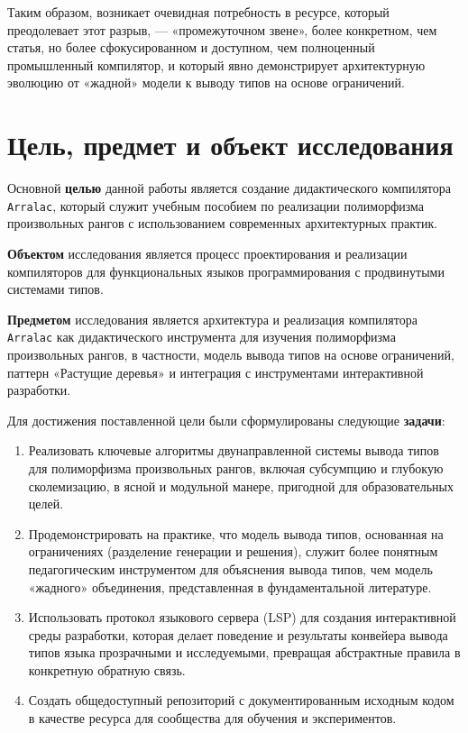 Таким образом, возникает очевидная потребность в ресурсе, который преодолевает этот разрыв, — «промежуточном звене», более конкретном, чем статья, но более сфокусированном и доступном, чем полноценный промышленный компилятор, и который явно демонстрирует архитектурную эволюцию от «жадной» модели к выводу типов на основе ограничений.

\section*{Цель, предмет и объект исследования}
Основной \textbf{целью} данной работы является создание дидактического компилятора \texttt{Arralac}, который служит учебным пособием по реализации полиморфизма произвольных рангов с использованием современных архитектурных практик.

\textbf{Объектом} исследования является процесс проектирования и реализации компиляторов для функциональных языков программирования с продвинутыми системами типов.

\textbf{Предметом} исследования является архитектура и реализация компилятора \texttt{Arralac} как дидактического инструмента для изучения полиморфизма произвольных рангов, в частности, модель вывода типов на основе ограничений, паттерн «Растущие деревья» и интеграция с инструментами интерактивной разработки.

Для достижения поставленной цели были сформулированы следующие \textbf{задачи}:
\begin{enumerate}
    \item Реализовать ключевые алгоритмы двунаправленной системы вывода типов для полиморфизма произвольных рангов, включая субсумпцию и глубокую сколемизацию, в ясной и модульной манере, пригодной для образовательных целей.
    \item Продемонстрировать на практике, что модель вывода типов, основанная на ограничениях (разделение генерации и решения), служит более понятным педагогическим инструментом для объяснения вывода типов, чем модель «жадного» объединения, представленная в фундаментальной литературе.
    \item Использовать протокол языкового сервера (LSP) для создания интерактивной среды разработки, которая делает поведение и результаты конвейера вывода типов языка прозрачными и исследуемыми, превращая абстрактные правила в конкретную обратную связь.
    \item Создать общедоступный репозиторий с документированным исходным кодом \cite{deemp-arbitrary-rank-tutorial} в качестве ресурса для сообщества для обучения и экспериментов.
\end{enumerate}

